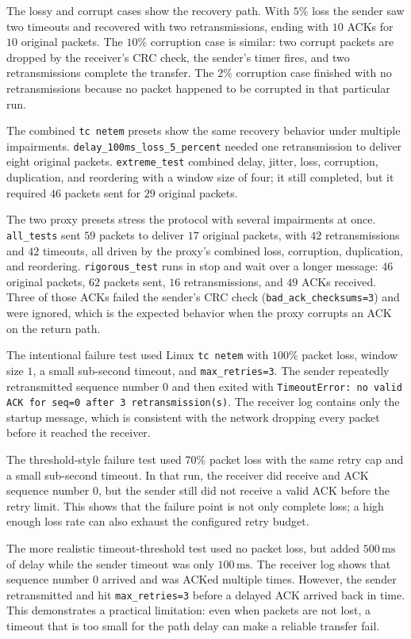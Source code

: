 \documentclass[conference]{IEEEtran}
\begin{document}
The lossy and corrupt cases show the recovery path. With $5\%$ loss the
sender saw two timeouts and recovered with two retransmissions, ending with
$10$ ACKs for $10$ original packets. The $10\%$ corruption case is similar:
two corrupt packets are dropped by the receiver's CRC check, the sender's
timer fires, and two retransmissions complete the transfer. The $2\%$
corruption case finished with no retransmissions because no packet happened
to be corrupted in that particular run.

The combined \texttt{tc netem} presets show the same recovery behavior under
multiple impairments. \texttt{delay\_100ms\_loss\_5\_percent} needed one
retransmission to deliver eight original packets. \texttt{extreme\_test}
combined delay, jitter, loss, corruption, duplication, and reordering with a
window size of four; it still completed, but it required $46$ packets sent for
$29$ original packets.

The two proxy presets stress the protocol with several impairments at once.
\texttt{all\_tests} sent $59$ packets to deliver $17$ original packets, with
$42$ retransmissions and $42$ timeouts, all driven by the proxy's combined
loss, corruption, duplication, and reordering. \texttt{rigorous\_test} runs in
stop and wait over a longer message: $46$ original packets, $62$ packets sent,
$16$ retransmissions, and $49$ ACKs received. Three of those ACKs failed the
sender's CRC check (\texttt{bad\_ack\_checksums=3}) and were ignored, which is
the expected behavior when the proxy corrupts an ACK on the return path.

The intentional failure test used Linux \texttt{tc netem} with $100\%$ packet
loss, window size $1$, a small sub-second timeout, and
\texttt{max\_retries=3}.
The sender repeatedly retransmitted sequence number $0$ and then exited with
\texttt{TimeoutError: no valid ACK for seq=0 after 3 retransmission(s)}. The
receiver log contains only the startup message, which is consistent with the
network dropping every packet before it reached the receiver.

The threshold-style failure test used $70\%$ packet loss with the same retry
cap and a small sub-second timeout. In that run, the receiver did receive and ACK sequence number
$0$, but the sender still did not receive a valid ACK before the retry limit.
This shows that the failure point is not only complete loss; a high enough loss
rate can also exhaust the configured retry budget.

The more realistic timeout-threshold test used no packet loss, but added
$500\,\text{ms}$ of delay while the sender timeout was only
$100\,\text{ms}$. The receiver log shows that sequence number $0$ arrived and
was ACKed multiple times. However, the sender retransmitted and hit
\texttt{max\_retries=3} before a delayed ACK arrived back in time. This
demonstrates a practical limitation: even when packets are not lost, a timeout
that is too small for the path delay can make a reliable transfer fail.
\end{document}
